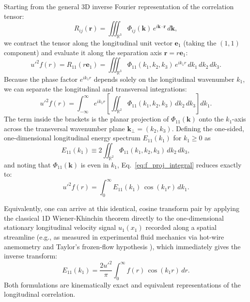 \documentclass[lineno]{jfm}
\begin{document}
Starting from the general 3D inverse Fourier representation of the correlation tensor:
\begin{equation}
R_{ij}(\mathbf{r}) = \iiint_{\mathbb{R}^3} \Phi_{ij}(\mathbf{k})\,e^{i \mathbf{k} \cdot \mathbf{r}}\,d\mathbf{k},
\end{equation}
we contract the tensor along the longitudinal unit vector $\mathbf{e}_1$ (taking the $(1,1)$ component) and evaluate it along the separation axis $\mathbf{r} = r \mathbf{e}_1$:
\begin{equation}
u'^2 f(r) = R_{11}(r\mathbf{e}_1) = \iiint_{\mathbb{R}^3} \Phi_{11}(k_1, k_2, k_3)\,e^{i k_1 r}\,dk_1\,dk_2\,dk_3.
\end{equation}
Because the phase factor $e^{i k_1 r}$ depends solely on the longitudinal wavenumber $k_1$, we can separate the longitudinal and transversal integrations:
\begin{equation}
u'^2 f(r) = \int_{-\infty}^\infty e^{i k_1 r} \left[ \iint_{\mathbb{R}^2} \Phi_{11}(k_1, k_2, k_3)\,dk_2\,dk_3 \right] dk_1.
\label{eq:f_proj_integral}
\end{equation}
The term inside the brackets is the planar projection of $\Phi_{11}(\mathbf{k})$ onto the $k_1$-axis across the transversal wavenumber plane $\mathbf{k}_\perp = (k_2, k_3)$. Defining the one-sided, one-dimensional longitudinal energy spectrum $E_{11}(k_1)$ for $k_1 \ge 0$ as
\begin{equation}
E_{11}(k_1) \equiv 2 \iint_{\mathbb{R}^2} \Phi_{11}(k_1, k_2, k_3)\,dk_2\,dk_3,
\label{eq:E11_def_plane_integral}
\end{equation}
and noting that $\Phi_{11}(\mathbf{k})$ is even in $k_1$, Eq.~\eqref{eq:f_proj_integral} reduces exactly to:
\begin{equation}
u'^2 f(r) = \int_0^\infty E_{11}(k_1)\,\cos(k_1 r)\,dk_1.
\label{eq:f_cos_E11}
\end{equation}

Equivalently, one can arrive at this identical, cosine transform pair by applying the classical 1D Wiener-Khinchin theorem directly to the one-dimensional stationary longitudinal velocity signal $u_1(x_1)$ recorded along a spatial streamline (e.g., as measured in experimental fluid mechanics via hot-wire anemometry and Taylor's frozen-flow hypothesis \citep{Taylor1935, Pope2000}), which immediately gives the inverse transform:
\begin{equation}
E_{11}(k_1) = \frac{2 u'^2}{\pi} \int_0^\infty f(r)\,\cos(k_1 r)\,dr.
\label{eq:E11_cos_f}
\end{equation}
Both formulations are kinematically exact and equivalent representations of the longitudinal correlation.
\end{document}
